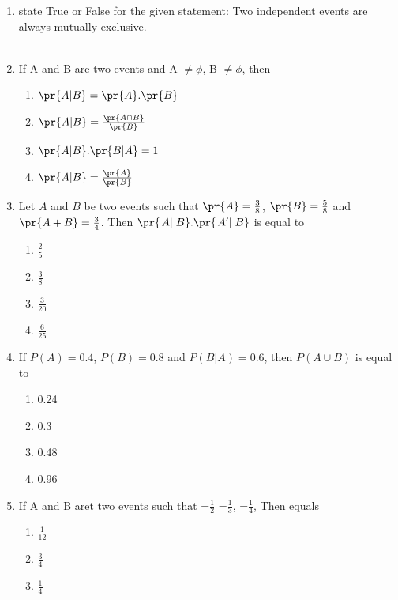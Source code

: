 \begin{enumerate}[label=\thesection.\arabic*,ref=\thesection.\theenumi]
%
\item state True or False for the given statement:
Two independent events are always mutually exclusive.\\
\solution \\
\item If A and B are two events and A $\ne \phi$, B $\ne \phi$, then
\begin{enumerate}
	\item $\pr{A|B} = \pr{A}.\pr{B}$
	\item $\pr{A|B} = \frac{\pr{A\cap B}}{\pr{B}}$
	\item $\pr{A|B}.\pr{B|A} = 1$
	\item $\pr{A|B} = \frac{\pr{A}}{\pr{B}}$
\end{enumerate}
\item Let $A$ and $B$ be two  events such that $\pr{A} = \frac{3}{8}$, $\pr{B} = \frac{5}{8}$ and $\pr{A+B} = \frac{3}{4}$. Then $\pr{\left.{A}|\right.{B}}.\pr{\left.{A^\prime} |\right.{B}}$ is equal to
\begin{enumerate}[label=(\alph*)]
\item $\frac{2}{5}$
\vspace{3pt}
\item $\frac{3}{8}$
\vspace{3pt}
\item $\frac{3}{20}$
\vspace{3pt}
\item $\frac{6}{25}$
\end{enumerate}
%
\item If $P(A)=0.4$, $P(B)=0.8$ and $P(B|A)=0.6$, then $P(A \cup B)$ is equal to
\begin{enumerate}
\item 0.24
\item 0.3
\item 0.48
\item 0.96
\end{enumerate}
\solution
%
\item If A and B aret two events such that  =$\frac{1}{2}$  =$\frac{1}{3}$, =$\frac{1}{4}$, Then  equals
\begin{enumerate}
	\item $\frac{1}{12}$
	\item $\frac{3}{4}$
	\item $\frac{1}{4}$

\end{enumerate}
\end{enumerate}
